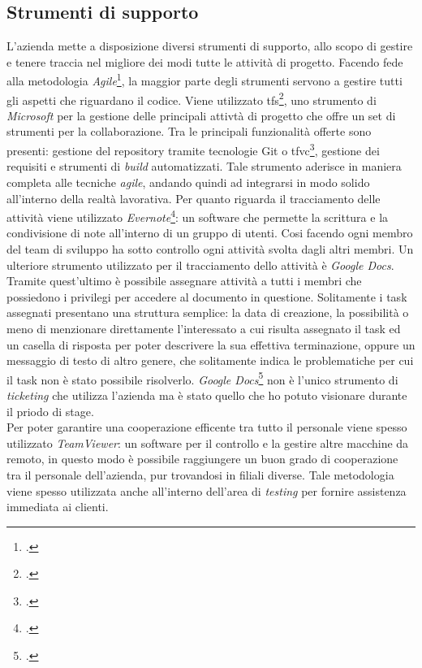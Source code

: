 \subsection{Strumenti di supporto }
L'azienda mette a disposizione diversi strumenti di supporto, allo scopo di gestire e tenere traccia nel migliore dei modi tutte le attività di progetto.
Facendo fede alla metodologia \textit{Agile}\footcite{Agile: https://it.wikipedia.org/wiki/Metodologia_agile}, la maggior parte degli strumenti servono a gestire tutti gli aspetti che riguardano il codice. Viene utilizzato \gls{tfs}\footcite{TFS: https://en.wikipedia.org/wiki/Azure_DevOps_Server}, uno strumento di \textit{Microsoft} per la gestione delle principali attivtà di progetto che offre un set di strumenti per la collaborazione. Tra le principali funzionalità offerte sono presenti: gestione del repository tramite tecnologie Git o \gls{tfvc}\footcite{TFVC: https://docs.microsoft.com/it-it/visualstudio/mac/tf-version-control?view=vsmac-2019}, gestione dei requisiti e strumenti di \textit{build} automatizzati. Tale strumento aderisce in maniera completa alle tecniche \textit{agile}, andando quindi ad integrarsi in modo solido all'interno della realtà lavorativa. Per quanto riguarda il tracciamento delle attività viene utilizzato \textit{Evernote}\footcite{Evernote: https://evernote.com/}: un software che permette la scrittura e la condivisione di note all'interno di un gruppo di utenti. Cosi facendo ogni membro del team di sviluppo ha sotto controllo ogni attività svolta dagli altri membri. Un ulteriore strumento utilizzato per il tracciamento dello attività è \textit{Google Docs}. Tramite quest'ultimo è possibile assegnare attività a tutti i membri che possiedono i privilegi per accedere al documento in questione. Solitamente i task assegnati presentano una struttura semplice: la data di creazione, la possibilità o meno di menzionare direttamente l'interessato a cui risulta assegnato il task ed un casella di risposta per poter descrivere la sua effettiva terminazione, oppure un messaggio di testo di altro genere, che solitamente indica le problematiche per cui il task non è stato possibile risolverlo. \textit{Google Docs}\footcite{Google Docs: https://docs.google.com/} non è l'unico strumento di \textit{ticketing} che utilizza l'azienda ma è stato quello che ho potuto visionare durante il priodo di stage.\\
Per poter garantire una cooperazione efficente tra tutto il personale viene spesso utilizzato \textit{TeamViewer}: un software per il controllo e la gestire altre macchine da remoto, in questo modo è possibile raggiungere un buon grado di cooperazione tra il personale dell'azienda, pur trovandosi in filiali diverse. Tale metodologia viene spesso utilizzata anche all'interno dell'area di \textit{testing} per fornire assistenza immediata ai clienti.
